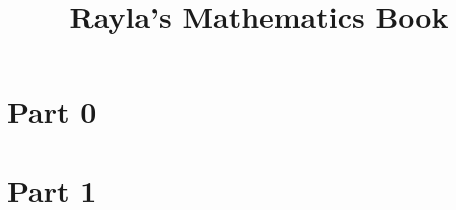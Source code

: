\documentclass{rayla_textbook}
\title{Rayla's Mathematics Book}
\begin{document}
    \frontmatter
    \raylaStartBook
    \mainmatter

    \part{Part 0}{\lipsum[1]}
    

    \part{Part 1}{\lipsum[1]}
    
%    
%    
%    
%    
%
%    
%    
%    
%    
%    

    ~\nocite{*}

    \backmatter
    \raylaEndBook
\end{document}
